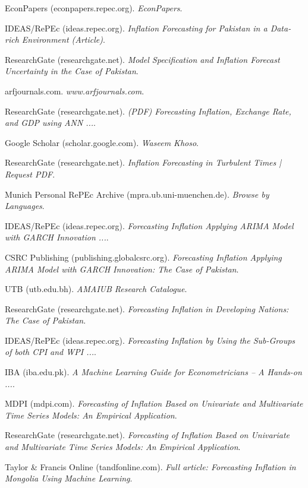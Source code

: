 \documentclass[12pt,a4paper]{article}
\begin{document}
\begin{thebibliography}{99}
 EconPapers (econpapers.repec.org). \emph{EconPapers}.

 IDEAS/RePEc (ideas.repec.org). \emph{Inflation Forecasting for Pakistan in a Data-rich Environment (Article)}.

 ResearchGate (researchgate.net). \emph{Model Specification and Inflation Forecast Uncertainty in the Case of Pakistan}.

 arfjournals.com. \emph{www.arfjournals.com}.

 ResearchGate (researchgate.net). \emph{(PDF) Forecasting Inflation, Exchange Rate, and GDP using ANN ...}.

 Google Scholar (scholar.google.com). \emph{Waseem Khoso}.

 ResearchGate (researchgate.net). \emph{Inflation Forecasting in Turbulent Times | Request PDF}.

 Munich Personal RePEc Archive (mpra.ub.uni-muenchen.de). \emph{Browse by Languages}.

 IDEAS/RePEc (ideas.repec.org). \emph{Forecasting Inflation Applying ARIMA Model with GARCH Innovation ...}.

 CSRC Publishing (publishing.globalcsrc.org). \emph{Forecasting Inflation Applying ARIMA Model with GARCH Innovation: The Case of Pakistan}.

 UTB (utb.edu.bh). \emph{AMAIUB Research Catalogue}.

 ResearchGate (researchgate.net). \emph{Forecasting Inflation in Developing Nations: The Case of Pakistan}.

 IDEAS/RePEc (ideas.repec.org). \emph{Forecasting Inflation by Using the Sub-Groups of both CPI and WPI ...}.

 IBA (iba.edu.pk). \emph{A Machine Learning Guide for Econometricians – A Hands-on ...}.

 MDPI (mdpi.com). \emph{Forecasting of Inflation Based on Univariate and Multivariate Time Series Models: An Empirical Application}.

 ResearchGate (researchgate.net). \emph{Forecasting of Inflation Based on Univariate and Multivariate Time Series Models: An Empirical Application}.

 Taylor \& Francis Online (tandfonline.com). \emph{Full article: Forecasting Inflation in Mongolia Using Machine Learning}.


\end{thebibliography}
\end{document}
